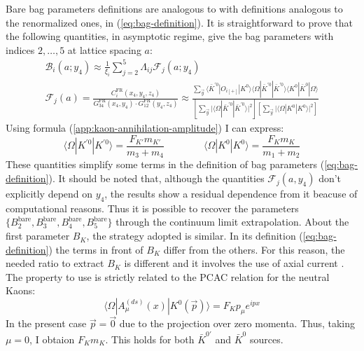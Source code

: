 \documentclass[english, LaM, oneside, noexaminfo]{sapthesis}
\newcommand{\la}{\langle}
\newcommand{\ra}{\rangle}
\newcommand{\bare}{^{\text{bare}}}
\begin{document}
Bare bag parameters definitions are analogous to  with definitions analogous to the renormalized ones, in (\ref{eq:bag-definition}).
It is straightforward to prove that the following quantities, in asymptotic regime, give the bag parameters with indices $2,\dots,5$ at lattice spacing $a$:
\begin{equation}\label{eq:bag-2to5-extraction}
    \begin{gathered}
        \mathcal{B}_i (a; y_4) \approx \frac{1}{\xi_i}\sum_{j=2}^5 \Lambda_{ij} \mathcal{F}_j (a; y_4) \\
        \mathcal{F}_j (a) = \frac{C_i^\text{FR}(x_4,y_4,z_4)}{G_{34}^\text{FR}(x_4,y_4) \cdot G_{12}^\text{FR}(y_4,z_4)} \approx \frac{\sum_{\vec y} \la \bar K^{'0} | O_{i[+]} | K^0 \ra  \la \Omega | \bar K^{'0} | \bar K^{'0} \ra  \la K^0 | \bar K^0 | \Omega \ra}{\left[ \sum_{\vec{y}} \Big| \la \Omega | \bar K^{'0} | \bar K^{'0} \ra \Big|^2 \right] \left[ \sum_{\vec y} \Big| \la \Omega |  K^0 |  K^0 \ra \Big|^2 \right]}
    \end{gathered}
\end{equation}
Using formula (\ref{app:kaon-annihilation-amplitude}) I can express:
\begin{equation*}
    \la \Omega | K^{'0} | K^{'0} \ra = \frac{F_{K'} m_{K'}}{m_3 + m_4} \qquad \qquad \la \Omega | K^{0} | K^{0} \ra = \frac{F_{K} m_{K}}{m_1 + m_2}
\end{equation*}
These quantities simplify some terms in the definition of bag parameters (\ref{eq:bag-definition}).
It should be noted that, although the quantities $\mathcal{F}_j(a,y_4)$ don't explicitly depend on $y_4$, the results show a residual dependence from it beacuse of computational reasons.
Thus it is possible to recover the parameters $\{B_2\bare,B_3\bare,B_4\bare,B_5\bare\}$ through the continuum limit extrapolation.
\newline
About the first parameter $B_K$, the strategy adopted is similar.
In its definition (\ref{eq:bag-definition}) the terms in front of $B_K$ differ from the others.
For this reason, the needed ratio to extract $B_K$ is different and it involves the use of axial current \cite{B_k-extrapolation}.
The property to use is strictly related to the PCAC relation for the neutral Kaons:
\begin{equation*}
    \la \Omega | A_\mu^{(ds)} (x) | K^0 (\vec p) \ra = F_K p_\mu e^{ipx}
\end{equation*}
In the present case $\vec p = \vec 0$ due to the projection over zero momenta.
Thus, taking $\mu = 0$, I obtaion $F_K m_K$. This holds for both $\bar K^{0'}$ and $\bar K^{0}$ sources.
\end{document}
